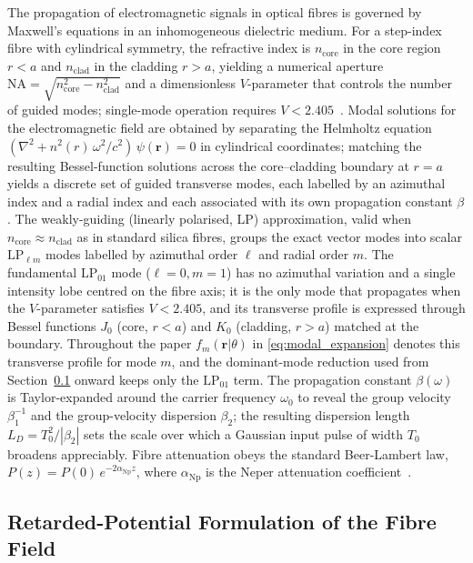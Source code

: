 \documentclass[journal,twocolumn]{IEEEtran}
\theoremstyle{definition}
\theoremstyle{plain}
\begin{document}
The propagation of electromagnetic signals in optical fibres is
governed by Maxwell's equations in an inhomogeneous dielectric
medium.  For a step-index fibre with cylindrical symmetry, the
refractive index is $n_{\mathrm{core}}$ in the core region $r < a$
and $n_{\mathrm{clad}}$ in the cladding $r > a$, yielding a
numerical aperture $\mathrm{NA}=\sqrt{n_{\mathrm{core}}^2 -
n_{\mathrm{clad}}^2}$ and a dimensionless $V$-parameter that
controls the number of guided modes; single-mode operation requires
$V < 2.405$~\cite{snyder1983}.  Modal solutions for the
electromagnetic field are obtained by separating the Helmholtz
equation $(\nabla^2 + n^2(r)\,\omega^2/c^2)\,\psi(\mathbf r) = 0$ in
cylindrical coordinates; matching the resulting Bessel-function
solutions across the core--cladding boundary at $r=a$ yields a
discrete set of guided transverse modes, each labelled by an
azimuthal index and a radial index and each associated with its own
propagation constant $\beta$. The weakly-guiding (linearly polarised,
LP) approximation, valid when $n_{\mathrm{core}} \approx
n_{\mathrm{clad}}$ as in standard silica fibres, groups the exact
vector modes into scalar $\mathrm{LP}_{\ell m}$ modes labelled by
azimuthal order $\ell$ and radial order $m$. The fundamental
$\mathrm{LP}_{01}$ mode ($\ell=0,m=1$) has no azimuthal variation and
a single intensity lobe centred on the fibre axis; it is the only
mode that propagates when the $V$-parameter satisfies $V<2.405$, and
its transverse profile is expressed through Bessel functions $J_0$
(core, $r<a$) and $K_0$ (cladding, $r>a$) matched at the boundary.
Throughout the paper $f_m(\mathbf r|\theta)$ in
\eqref{eq:modal_expansion} denotes this transverse profile for mode
$m$, and the dominant-mode reduction used from
Section~\ref{subsec:retarded} onward keeps only the $\mathrm{LP}_{01}$
term. The propagation constant $\beta(\omega)$ is Taylor-expanded
around the carrier frequency $\omega_0$ to reveal the group velocity
$\beta_1^{-1}$ and the group-velocity dispersion $\beta_2$; the
resulting dispersion length $L_D = T_0^2/|\beta_2|$ sets the scale
over which a Gaussian input pulse of width $T_0$ broadens
appreciably.  Fibre attenuation obeys the standard Beer-Lambert law,
$P(z) = P(0)\,e^{-2\alpha_{\mathrm{Np}}z}$, where $\alpha_{\mathrm{Np}}$
is the Neper attenuation coefficient~\cite{agrawal2007}.

\subsection{Retarded-Potential Formulation of the Fibre Field}
\label{subsec:retarded}
\end{document}
